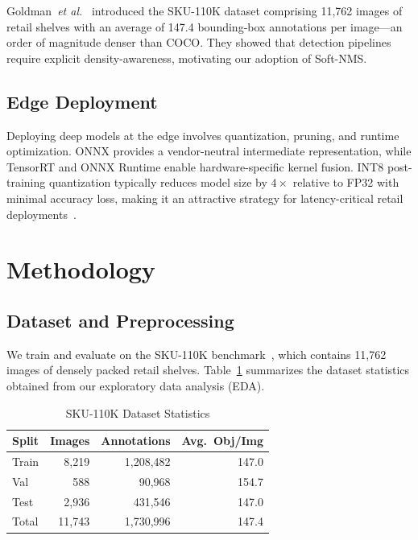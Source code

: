 \documentclass[conference]{IEEEtran}
\newcommand{\etal}{\emph{et al.}}
\begin{document}
Goldman~\etal~\cite{goldman2019dense} introduced the SKU-110K dataset
comprising 11,762 images of retail shelves with an average of 147.4
bounding-box annotations per image---an order of magnitude denser than
COCO. They showed that detection pipelines require explicit
density-awareness, motivating our adoption of Soft-NMS.

\subsection{Edge Deployment}

Deploying deep models at the edge involves quantization, pruning, and
runtime optimization. ONNX provides a vendor-neutral intermediate
representation, while TensorRT and ONNX Runtime enable hardware-specific
kernel fusion. INT8 post-training quantization typically reduces model
size by $4\times$ relative to FP32 with minimal accuracy loss, making it
an attractive strategy for latency-critical retail
deployments~\cite{chen2019mmdetection}.

\section{Methodology}
\label{sec:method}

\subsection{Dataset and Preprocessing}
\label{sec:dataset}

We train and evaluate on the SKU-110K
benchmark~\cite{goldman2019dense}, which contains 11,762 images of densely
packed retail shelves. Table~\ref{tab:dataset} summarizes the dataset
statistics obtained from our exploratory data analysis (EDA).

\begin{table}[t]
  \centering
  \caption{SKU-110K Dataset Statistics}
  \label{tab:dataset}
  \begin{tabular}{@{}lrrr@{}}
    \toprule
    Split & Images & Annotations & Avg.\ Obj/Img \\
    \midrule
    Train  & 8,219  & 1,208,482 & 147.0 \\
    Val    & 588    & 90,968    & 154.7 \\
    Test   & 2,936  & 431,546   & 147.0 \\
    \midrule
    Total  & 11,743 & 1,730,996 & 147.4 \\
    \bottomrule
  \end{tabular}
\end{table}
\end{document}
